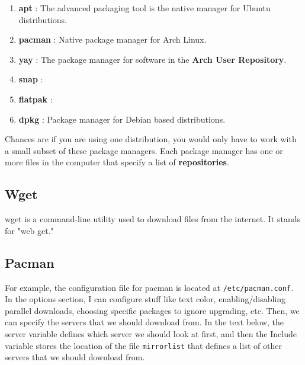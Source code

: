 \documentclass{article}
\begin{document}
  \begin{enumerate}
    \item \textbf{apt} : The advanced packaging tool is the native manager for Ubuntu distributions. 
    \item \textbf{pacman} : Native package manager for Arch Linux. 
    \item \textbf{yay} : The package manager for software in the \textbf{Arch User Repository}. 
    \item \textbf{snap} : 
    \item \textbf{flatpak} : 
    \item \textbf{dpkg} : Package manager for Debian based distributions. 
  \end{enumerate}

  Chances are if you are using one distribution, you would only have to work with a small subset of these package managers. Each package manager has one or more files in the computer that specify a list of \textbf{repositories}. 

  \subsection{Wget}

    wget is a command-line utility used to download files from the internet. It stands for "web get." 

  \subsection{Pacman}

    For example, the configuration file for pacman is located at \texttt{/etc/pacman.conf}. In the options section, I can configure stuff like text color, enabling/disabling parallel downloads, choosing specific packages to ignore upgrading, etc. Then, we can specify the servers that we should download from. In the text below, the server variable defines which server we should look at first, and then the Include variable stores the location of the file \texttt{mirrorlist} that defines a list of other servers that we should download from. 
    
\end{document}
